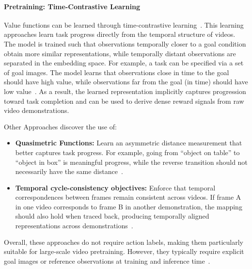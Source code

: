 \paragraph{Pretraining: Time-Contrastive Learning}

Value functions can be learned through time-contrastive learning~\cite{Ma2022VIPTU}. 
This learning approaches learn task progress directly from the temporal structure of videos. The model is trained such that observations temporally closer to a goal condition obtain more similar representations, while temporally distant observations are separated in the embedding space. For example, a task can be specified via a set of goal images. The model learns that observations close in time to the goal should have high value, while observations far from the goal (in time) should have low value~\cite{Ma2022VIPTU}. As a result, the learned representation implicitly captures progression toward task completion and can be used to derive dense reward signals from raw video demonstrations.

Other Approaches discover the use of:
\begin{itemize}
    \item \textbf{Quasimetric Functions:} Learn an asymmetric distance measurement that better captures task progress. For example, going from ``object on table'' to ``object in box'' is meaningful progress, while the reverse transition should not necessarily have the same distance~\cite{Wang2023OptimalGR}.
    
    \item \textbf{Temporal cycle-consistency objectives:} Enforce that temporal correspondences between frames remain consistent across videos. If frame A in one video corresponds to frame B in another demonstration, the mapping should also hold when traced back, producing temporally aligned representations across demonstrations~\cite{Zakka2021XIRLCI}.
\end{itemize}

Overall, these approaches do not require action labels, making them particularly suitable for large-scale video pretraining. However, they typically require explicit goal images or reference observations at training and inference time~\cite{McCarthy_2025}. 


